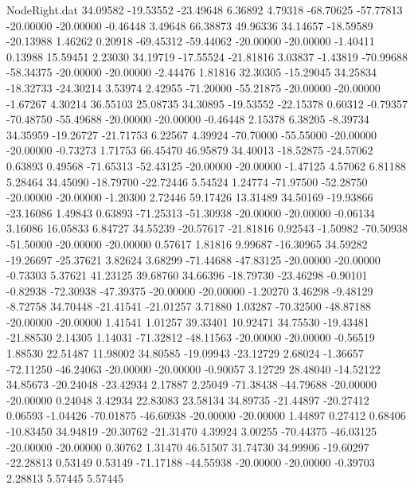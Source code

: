 \begin{filecontents}{NodeRight.dat}
  34.09582  -19.53552  -23.49648     6.36892    4.79318  -68.70625  -57.77813  -20.00000  -20.00000   -0.46448    3.49648   66.38873   49.96336
  34.14657  -18.59589  -20.13988     1.46262    0.20918  -69.45312  -59.44062  -20.00000  -20.00000   -1.40411    0.13988   15.59451    2.23030
  34.19719  -17.55524  -21.81816     3.03837   -1.43819  -70.99688  -58.34375  -20.00000  -20.00000   -2.44476    1.81816   32.30305  -15.29045
  34.25834  -18.32733  -24.30214     3.53974    2.42955  -71.20000  -55.21875  -20.00000  -20.00000   -1.67267    4.30214   36.55103   25.08735
  34.30895  -19.53552  -22.15378     0.60312   -0.79357  -70.48750  -55.49688  -20.00000  -20.00000   -0.46448    2.15378    6.38205   -8.39734
  34.35959  -19.26727  -21.71753     6.22567    4.39924  -70.70000  -55.55000  -20.00000  -20.00000   -0.73273    1.71753   66.45470   46.95879
  34.40013  -18.52875  -24.57062     0.63893    0.49568  -71.65313  -52.43125  -20.00000  -20.00000   -1.47125    4.57062    6.81188    5.28464
  34.45090  -18.79700  -22.72446     5.54524    1.24774  -71.97500  -52.28750  -20.00000  -20.00000   -1.20300    2.72446   59.17426   13.31489
  34.50169  -19.93866  -23.16086     1.49843    0.63893  -71.25313  -51.30938  -20.00000  -20.00000   -0.06134    3.16086   16.05833    6.84727
  34.55239  -20.57617  -21.81816     0.92543   -1.50982  -70.50938  -51.50000  -20.00000  -20.00000    0.57617    1.81816    9.99687  -16.30965
  34.59282  -19.26697  -25.37621     3.82624    3.68299  -71.44688  -47.83125  -20.00000  -20.00000   -0.73303    5.37621   41.23125   39.68760
  34.66396  -18.79730  -23.46298    -0.90101   -0.82938  -72.30938  -47.39375  -20.00000  -20.00000   -1.20270    3.46298   -9.48129   -8.72758
  34.70448  -21.41541  -21.01257     3.71880    1.03287  -70.32500  -48.87188  -20.00000  -20.00000    1.41541    1.01257   39.33401   10.92471
  34.75530  -19.43481  -21.88530     2.14305    1.14031  -71.32812  -48.11563  -20.00000  -20.00000   -0.56519    1.88530   22.51487   11.98002
  34.80585  -19.09943  -23.12729     2.68024   -1.36657  -72.11250  -46.24063  -20.00000  -20.00000   -0.90057    3.12729   28.48040  -14.52122
  34.85673  -20.24048  -23.42934     2.17887    2.25049  -71.38438  -44.79688  -20.00000  -20.00000    0.24048    3.42934   22.83083   23.58134
  34.89735  -21.44897  -20.27412     0.06593   -1.04426  -70.01875  -46.60938  -20.00000  -20.00000    1.44897    0.27412    0.68406  -10.83450
  34.94819  -20.30762  -21.31470     4.39924    3.00255  -70.44375  -46.03125  -20.00000  -20.00000    0.30762    1.31470   46.51507   31.74730
  34.99906  -19.60297  -22.28813     0.53149    0.53149  -71.17188  -44.55938  -20.00000  -20.00000   -0.39703    2.28813    5.57445    5.57445

\end{filecontents}
